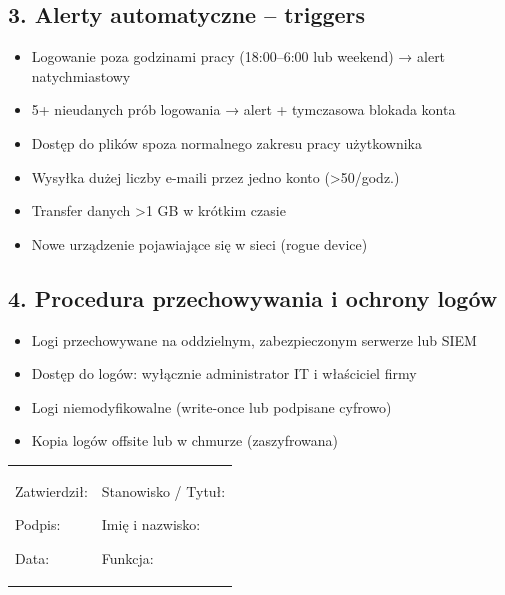 \documentclass[12pt,a4paper]{article}
\providecommand{\tightlist}{\setlength{\itemsep}{0pt}\setlength{\parskip}{0pt}}
\begin{document}
\subsection{3. Alerty automatyczne --
triggers}\label{alerty-automatyczne-triggers}

\begin{itemize}
\tightlist
\item
  Logowanie poza godzinami pracy (18:00--6:00 lub weekend) → alert
  natychmiastowy
\item
  5+ nieudanych prób logowania → alert + tymczasowa blokada konta
\item
  Dostęp do plików spoza normalnego zakresu pracy użytkownika
\item
  Wysyłka dużej liczby e-maili przez jedno konto (\textgreater50/godz.)
\item
  Transfer danych \textgreater1 GB w krótkim czasie
\item
  Nowe urządzenie pojawiające się w sieci (rogue device)
\end{itemize}

\subsection{4. Procedura przechowywania i ochrony
logów}\label{procedura-przechowywania-i-ochrony-loguxf3w}

\begin{itemize}
\tightlist
\item
  Logi przechowywane na oddzielnym, zabezpieczonym serwerze lub SIEM
\item
  Dostęp do logów: wyłącznie administrator IT i właściciel firmy
\item
  Logi niemodyfikowalne (write-once lub podpisane cyfrowo)
\item
  Kopia logów offsite lub w chmurze (zaszyfrowana)
\end{itemize}

\begin{longtable}[]{@{}
  >{\raggedright\arraybackslash}p{}
  >{\raggedright\arraybackslash}p{}@{}}
\toprule\noalign{}
\endhead
\bottomrule\noalign{}
\endlastfoot
\begin{minipage}[t]{\linewidth}\raggedright
Zatwierdził:

Podpis: \underline{\hspace{3cm}}

Data: \underline{\hspace{4cm}}
\end{minipage} & \begin{minipage}[t]{\linewidth}\raggedright
Stanowisko / Tytuł:

Imię i nazwisko: \underline{\hspace{3cm}}

Funkcja: \underline{\hspace{3cm}}
\end{minipage} \\
\end{longtable}
\end{document}
